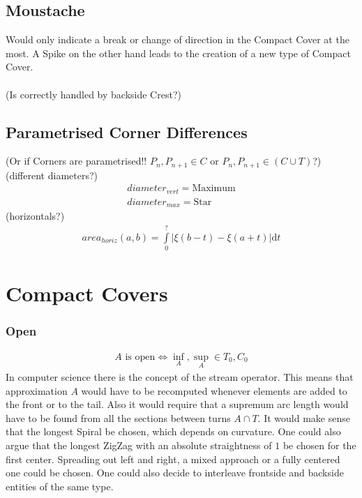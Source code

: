 \documentclass{report}
\begin{document}
\subsection{Moustache}
Would only indicate a break or change of direction in the Compact Cover at the most. A Spike on the other hand leads to the creation of a new type of Compact Cover.\\\\
(Is correctly handled by backside Crest?)

\subsection*{Parametrised Corner Differences}
(Or if Corners are parametrised!! $P_{n},P_{n+1} \in C$ or $P_{n},P_{n+1} \in (C \cup T)$?)\\
(different diameters?)
\begin{align}
diameter_{vert}=\text{Maximum}\\
diameter_{max}=\text{Star}
\end{align}
(horizontals?)
\begin{align}
area_{horiz}(a,b)=\int \limits _{0}^{?} \lvert \xi(b-t)-\xi(a+t) \rvert \mathrm{d}t
\end{align}


\section{Compact Covers}
\subsubsection*{Open}
\begin{align}
A \text{ is open} \Leftrightarrow \inf_{A},\sup_{A}\in T_{0},C_{0}
\end{align}
In computer science there is the concept of the stream operator. This means that approximation $A$ would have to be recomputed whenever elements are added to the front or to the tail. Also it would require that a supremum arc length would have to be found from all the sections between turns $A \cap T$. It would make sense that the longest Spiral be chosen, which depends on curvature. One could also argue that the longest ZigZag with an absolute straightness of $1$ be chosen for the first center. Spreading out left and right, a mixed approach or a fully centered one could be chosen. One could also decide to interleave frontside and backside entities of the same type.
\end{document}
